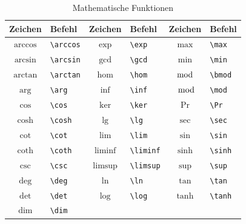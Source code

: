 \documentclass[a4paper,10pt,twoside]{scrbook}
\begin{document}
\begin{table}[h!tb]
\centering
\caption{Mathematische Funktionen}
\label{Tabelle_Mathematische_Funktionen}       %
\begin{tabular}{clclcl}
\hline
Zeichen & Befehl & Zeichen & Befehl & Zeichen & Befehl \\
\hline
$\arccos$ & \texttt{\textbackslash arccos} & 
$\exp$ & \texttt{\textbackslash exp} & 
$\max$ & \texttt{\textbackslash max} \\
$\arcsin$  & \texttt{\textbackslash arcsin} & 
$\gcd$ & \texttt{\textbackslash gcd} & 
$\min$ & \texttt{\textbackslash min} \\
$\arctan$ & \texttt{\textbackslash arctan} & 
$\hom$ & \texttt{\textbackslash hom} & 
$\bmod$ & \texttt{\textbackslash bmod} \\
$\arg$ & \texttt{\textbackslash arg} & 
$\inf$ & \texttt{\textbackslash inf} & 
$\mod$ & \texttt{\textbackslash mod} \\
$\cos$ & \texttt{\textbackslash cos} & 
$\ker$ & \texttt{\textbackslash ker} & 
$\Pr$ & \texttt{\textbackslash Pr} \\
$\cosh$ & \texttt{\textbackslash cosh} & 
$\lg$ & \texttt{\textbackslash lg} & 
$\sec$ & \texttt{\textbackslash sec} \\
$\cot$ & \texttt{\textbackslash cot} & 
$\lim$ & \texttt{\textbackslash lim} & 
$\sin$ & \texttt{\textbackslash sin} \\
$\coth$ & \texttt{\textbackslash coth} & 
$\liminf$ & \texttt{\textbackslash liminf} & 
$\sinh$ & \texttt{\textbackslash sinh} \\
$\csc$ & \texttt{\textbackslash csc} &
$\limsup$ & \texttt{\textbackslash limsup} & 
$\sup$ & \texttt{\textbackslash sup} \\
$\deg$ & \texttt{\textbackslash deg} & 
$\ln$ & \texttt{\textbackslash ln} & 
$\tan$ & \texttt{\textbackslash tan} \\
$\det$ & \texttt{\textbackslash det} & 
$\log$ & \texttt{\textbackslash log} & 
$\tanh$ & \texttt{\textbackslash tanh} \\
$\dim$ & \texttt{\textbackslash dim} & & & & \\
\hline
\end{tabular}

\end{table}
\end{document}
